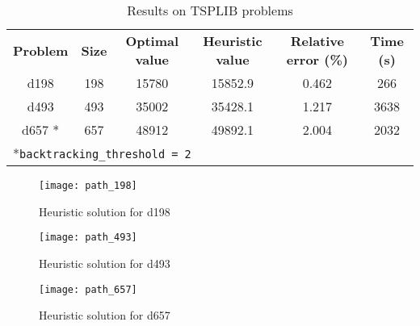 \begin{table}[h]
	\caption{Results on TSPLIB problems}
	\label{tab:tsplibr}
	\centering
	\begin{tabular}[t]{cccccc}
		\rowcolor[HTML]{EFEFEF}
		\textbf{Problem} & \textbf{Size} & \textbf{Optimal value} & \textbf{Heuristic value} & \textbf{Relative error (\%)} & \textbf{Time (s)} \\
		d198    & 198 & 15780 & 15852.9 & 0.462  & 266   \\
		d493    & 493 & 35002 & 35428.1 & 1.217 & 3638	\\
		d657 *	& 657 & 48912 & 49892.1 & 2.004	&  2032 \\
		\multicolumn{6}{l}{\rule{0pt}{4ex}*\texttt{backtracking\_threshold = 2}} 
	\end{tabular}
\end{table}

\begin{figure}[H]
	\centering
	\texttt{[image: path\_198]}
	\caption{Heuristic solution for d198}
	\label{fig:p198}
\end{figure}

\begin{figure}[H]
	\centering
	\texttt{[image: path\_493]}
	\caption{Heuristic solution for d493}
	\label{fig:p493}
\end{figure}

\begin{figure}[H]
	\centering
	\texttt{[image: path\_657]}
	\caption{Heuristic solution for d657}
	\label{fig:p657}
\end{figure}


